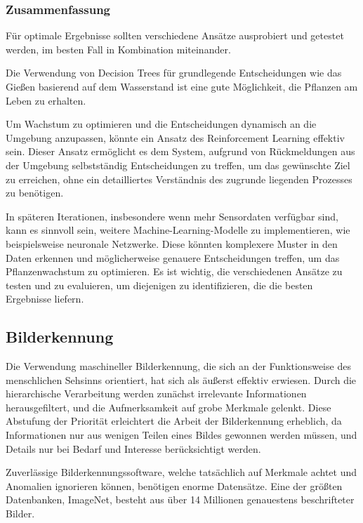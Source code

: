 \subsubsection{Zusammenfassung}
Für optimale Ergebnisse sollten verschiedene Ansätze ausprobiert und getestet werden, im besten Fall in Kombination miteinander.

Die Verwendung von Decision Trees für grundlegende Entscheidungen wie das Gießen basierend auf dem Wasserstand ist eine gute Möglichkeit, die Pflanzen am Leben zu erhalten.

Um Wachstum zu optimieren und die Entscheidungen dynamisch an die Umgebung anzupassen, könnte ein Ansatz des Reinforcement Learning effektiv sein. Dieser Ansatz ermöglicht es dem System, aufgrund von Rückmeldungen aus der Umgebung selbstständig Entscheidungen zu treffen, um das gewünschte Ziel zu erreichen, ohne ein detailliertes Verständnis des zugrunde liegenden Prozesses zu benötigen.

In späteren Iterationen, insbesondere wenn mehr Sensordaten verfügbar sind, kann es sinnvoll sein, weitere Machine-Learning-Modelle zu implementieren, wie beispielsweise neuronale Netzwerke. Diese könnten komplexere Muster in den Daten erkennen und möglicherweise genauere Entscheidungen treffen, um das Pflanzenwachstum zu optimieren. Es ist wichtig, die verschiedenen Ansätze zu testen und zu evaluieren, um diejenigen zu identifizieren, die die besten Ergebnisse liefern.

\subsection{Bilderkennung}
Die Verwendung maschineller Bilderkennung, die sich an der Funktionsweise des menschlichen Sehsinns orientiert, hat sich als äußerst effektiv erwiesen. Durch die hierarchische Verarbeitung werden zunächst irrelevante Informationen herausgefiltert, und die Aufmerksamkeit auf grobe Merkmale gelenkt.\cite{trendskout2024image-recognition} Diese Abstufung der Priorität erleichtert die Arbeit der Bilderkennung erheblich, da Informationen nur aus wenigen Teilen eines Bildes gewonnen werden müssen, und Details nur bei Bedarf und Interesse berücksichtigt werden.

Zuverlässige Bilderkennungssoftware, welche tatsächlich auf Merkmale achtet und Anomalien ignorieren können, benötigen enorme Datensätze. Eine der größten Datenbanken, ImageNet, besteht aus über 14 Millionen genauestens beschrifteter Bilder. \cite{imagenet2020}

